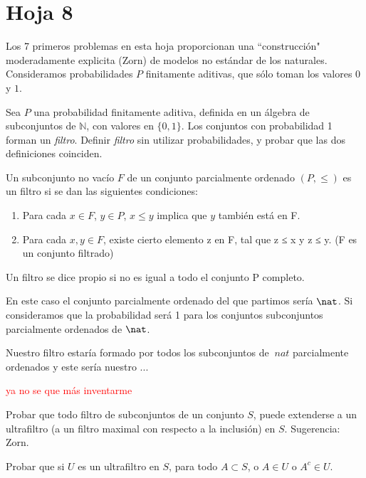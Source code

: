 \section{Hoja 8}
Los 7  primeros problemas en esta hoja proporcionan una ``construcción" moderadamente explicita (Zorn) de modelos
no estándar de los naturales. Consideramos probabilidades $P$ finitamente aditivas, que sólo toman los valores
$0$ y $1$.

\begin{problem}
Sea $P$ una probabilidad finitamente aditiva, definida en un álgebra de subconjuntos de $\mathbb{N}$,
con valores en $\{0,1\}$. Los conjuntos con probabilidad 1 forman un {\em filtro}. Definir {\em filtro} sin utilizar
probabilidades, y probar que las dos definiciones coinciden.

\solution

Un subconjunto no vacío $F$ de un conjunto parcialmente ordenado $(P,≤)$ es un filtro si se dan las siguientes condiciones:

\begin{enumerate}
\item Para cada $x \in F$, $y \in P$, $x ≤ y$ implica que $y$ también está en F.
\item Para cada $x, y \in F$, existe cierto elemento z en F, tal que z ≤ x y z ≤ y. (F es un conjunto filtrado)
\end{enumerate}
Un filtro se dice propio si no es igual a todo el conjunto P completo.

En este caso el conjunto parcialmente ordenado del que partimos sería $\nat$. Si consideramos que la probabilidad será 1 para los conjuntos subconjuntos parcialmente ordenados de $\nat$.

Nuestro filtro estaría formado por todos los subconjuntos de $\
nat$ parcialmente ordenados y este sería nuestro ...

\textcolor{red}{ya no se que más inventarme}
\end{problem}

\begin{problem}
Probar que todo filtro de subconjuntos de un conjunto $S$,
 puede extenderse a un ultrafiltro (a un filtro maximal con respecto a la inclusión) en $S$.
Sugerencia: Zorn.

\solution

\end{problem}

\begin{problem}
Probar que si $U$ es un ultrafiltro en $S$, para todo $A\subset S$, o $A\in U$ o $A^c\in U$.

\solution

\end{problem}

